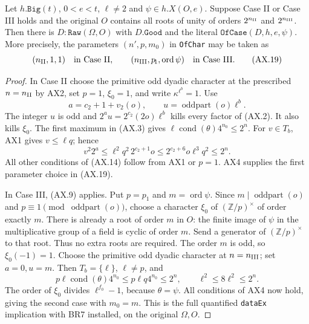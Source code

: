 \begin{proposition}
\label{prop:ax-dataex}
Let $h.\mathtt{Big}(t)$, $0<e<t$, $\ell\ne2$ and
$\psi\in h.X(O,e)$.  Suppose Case II or Case III holds and the
original $O$ contains all roots of unity of orders
$2^{n_{\rm II}}$ and $2^{n_{\rm III}}$.  Then there is
$D:\mathtt{Raw}(\Omega,O)$ with $D.\mathtt{Good}$ and the literal
$\mathtt{OfCase}(D,h,e,\psi)$.  More precisely, the parameters
$(n',p,m_0)$ in \texttt{OfChar} may be taken as
\[
 (n_{\rm II},1,1)\quad\text{in Case II},\qquad
 (n_{\rm III},p_{\!1},\operatorname{ord}\psi)
                         \quad\text{in Case III}.
 \tag{AX.19}
\]
\end{proposition}

\begin{proof}
In Case II choose the primitive odd dyadic character at the
prescribed $n=n_{\rm II}$ by AX2, set $p=1$, $\xi_0=1$, and write
$\kappa^{\ell^b}=1$.  Use
\[
 a=c_2+1+v_2(o),\qquad u=\operatorname{oddpart}(o)\ell^b.
 \tag{AX.20}
\]
The integer $u$ is odd and
$2^a u=2^{c_2}(2o)\ell^b$ kills every factor of (AX.2).
It also kills $\xi_0$.  The first maximum in (AX.3) gives
$\ell\operatorname{cond}(\theta)4^{n_0}\le2^n$.
For $v\in T_b$, AX1 gives $v\le\ell q$; hence
\[
 v^2 2^a\le\ell^2q^2\,2^{c_2+1}o
            \le2^{c_2+6}o\ell^3q^2\le2^n.
 \tag{AX.21}
\]
All other conditions of (AX.14) follow from AX1 or $p=1$.
AX4 supplies the first parameter choice in (AX.19).

In Case III, (AX.9) applies.  Put $p=p_{\!1}$ and
$m=\operatorname{ord}\psi$.  Since $m\mid\operatorname{oddpart}(o)$
and $p\equiv1\pmod{\operatorname{oddpart}(o)}$, choose a character
$\xi_0$ of $(\mathbb Z/p)^\times$ of order exactly $m$.
There is already a root of order $m$ in $O$: the finite image of
$\psi$ in the multiplicative group of a field is cyclic of order
$m$.  Send a generator of $(\mathbb Z/p)^\times$ to that root.
Thus no extra roots are required.  The order $m$ is odd, so
$\xi_0(-1)=1$.  Choose the primitive odd dyadic character at
$n=n_{\rm III}$; set $a=0,u=m$.  Then $T_b=\{\ell\}$,
$\ell\ne p$, and
\[
 p\ell\operatorname{cond}(\theta)4^{n_0}
 \le p\ell q4^{n_0}\le2^n,
 \qquad \ell^2\le8\ell^2\le2^n.
 \tag{AX.22}
\]
The order of $\xi_0$ divides $\ell^{f_0}-1$, because
$\theta=\psi$.  All conditions of AX4 now hold, giving the second
case with $m_0=m$.  This is the full quantified \texttt{dataEx}
implication with BR7 installed, on the original $\Omega,O$.
\end{proof}

